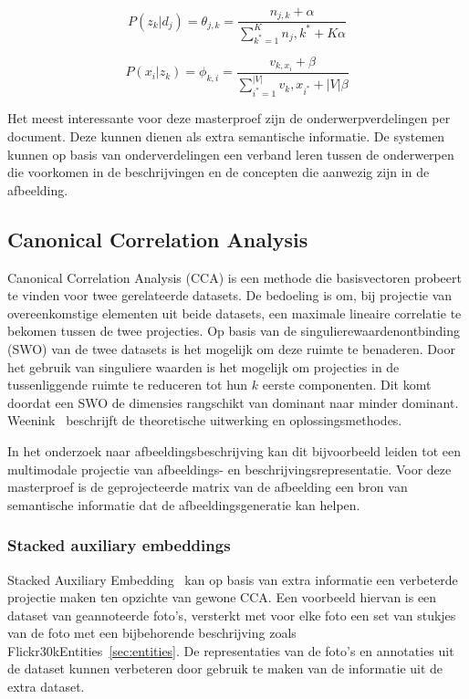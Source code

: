 \begin{equation}
    P(z_k|d_j) = \theta_{j,k} = \frac{n_{j,k} + \alpha}{\sum_{k^*=1}^K n_j,k^* + K\alpha}
    \label{form:doctopic}
\end{equation}

\begin{equation}
    P(x_i|z_k) = \phi_{k,i} = \frac{v_{k,x_i} + \beta}{\sum_{i^*=1}^{|V|} v_k,x_{i^*} + |V|\beta}
    \label{form:topicword}
\end{equation}

Het meest interessante voor deze masterproef zijn de onderwerpverdelingen per document. Deze kunnen dienen als extra semantische informatie. De systemen kunnen op basis van onderverdelingen een verband leren tussen de onderwerpen die voorkomen in de beschrijvingen en de concepten die aanwezig zijn in de afbeelding. 


\subsection{Canonical Correlation Analysis}
       
Canonical Correlation Analysis (CCA) is een methode die basisvectoren probeert te vinden voor twee gerelateerde datasets. De bedoeling is om, bij projectie van overeenkomstige elementen uit beide datasets, een maximale lineaire correlatie te bekomen tussen de twee projecties. 
Op basis van de singulierewaardenontbinding (SWO) van de twee datasets is het mogelijk om deze ruimte te benaderen. Door het gebruik van singuliere waarden is het mogelijk om projecties in de tussenliggende ruimte te reduceren tot hun $k$ eerste componenten. Dit komt doordat een SWO de dimensies rangschikt van dominant naar minder dominant. Weenink~\cite{Weenink2003} beschrijft de theoretische uitwerking en oplossingsmethodes.

In het onderzoek naar afbeeldingsbeschrijving kan dit bijvoorbeeld leiden tot een multimodale projectie van afbeeldings- en beschrijvingsrepresentatie. Voor deze masterproef is de geprojecteerde matrix van de afbeelding een bron van semantische informatie dat de afbeeldingsgeneratie kan helpen.

\subsubsection{Stacked auxiliary embeddings}
\label{sub:stackedcca}  
Stacked Auxiliary Embedding~\cite{Gong2014} kan op basis van extra informatie een verbeterde projectie maken ten opzichte van gewone CCA. Een voorbeeld hiervan is een dataset van geannoteerde foto's, versterkt met voor elke foto een set van stukjes van de foto met een bijbehorende beschrijving zoals Flickr30kEntities~\ref{sec:entities}. De representaties van de foto's en annotaties uit de dataset kunnen verbeteren door gebruik te maken van de informatie uit de extra dataset.

